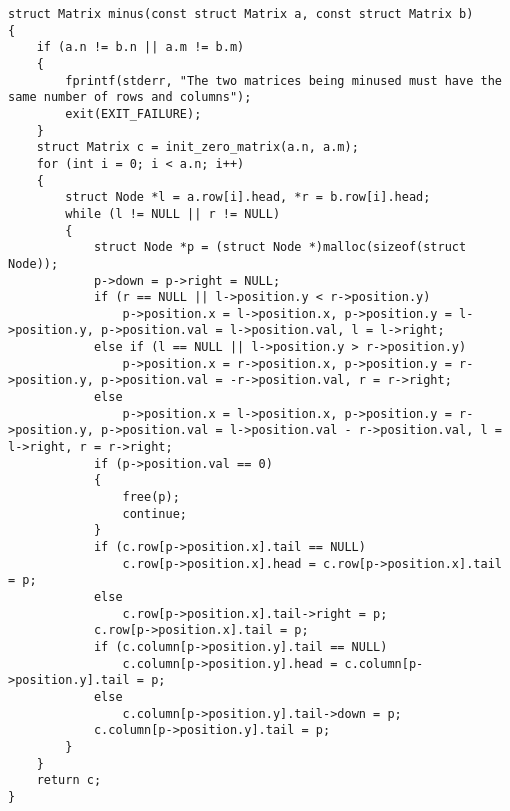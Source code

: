 \documentclass[12pt]{article}
\begin{document}
{\begin{lstlisting}
struct Matrix minus(const struct Matrix a, const struct Matrix b)
{
    if (a.n != b.n || a.m != b.m)
    {
        fprintf(stderr, "The two matrices being minused must have the same number of rows and columns");
        exit(EXIT_FAILURE);
    }
    struct Matrix c = init_zero_matrix(a.n, a.m);
    for (int i = 0; i < a.n; i++)
    {
        struct Node *l = a.row[i].head, *r = b.row[i].head;
        while (l != NULL || r != NULL)
        {
            struct Node *p = (struct Node *)malloc(sizeof(struct Node));
            p->down = p->right = NULL;
            if (r == NULL || l->position.y < r->position.y)
                p->position.x = l->position.x, p->position.y = l->position.y, p->position.val = l->position.val, l = l->right;
            else if (l == NULL || l->position.y > r->position.y)
                p->position.x = r->position.x, p->position.y = r->position.y, p->position.val = -r->position.val, r = r->right;
            else
                p->position.x = l->position.x, p->position.y = r->position.y, p->position.val = l->position.val - r->position.val, l = l->right, r = r->right;
            if (p->position.val == 0)
            {
                free(p);
                continue;
            }
            if (c.row[p->position.x].tail == NULL)
                c.row[p->position.x].head = c.row[p->position.x].tail = p;
            else
                c.row[p->position.x].tail->right = p;
            c.row[p->position.x].tail = p;
            if (c.column[p->position.y].tail == NULL)
                c.column[p->position.y].head = c.column[p->position.y].tail = p;
            else
                c.column[p->position.y].tail->down = p;
            c.column[p->position.y].tail = p;
        }
    }
    return c;
}


\end{lstlisting}}
\end{document}
